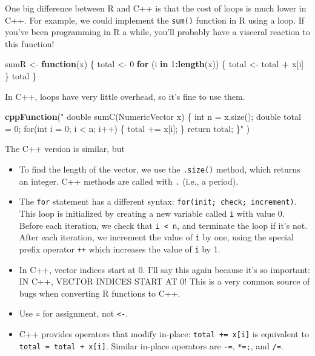 \documentclass[
]{krantz}
\makeatletter
\newenvironment{Shaded}{\begin{snugshade}}{\end{snugshade}}
\newcommand{\ControlFlowTok}[1]{\textcolor[rgb]{0.27,0.27,0.27}{\textbf{#1}}}
\newcommand{\DecValTok}[1]{\textcolor[rgb]{0.06,0.06,0.06}{#1}}
\newcommand{\KeywordTok}[1]{\textcolor[rgb]{0.27,0.27,0.27}{\textbf{#1}}}
\newcommand{\NormalTok}[1]{#1}
\newcommand{\OperatorTok}[1]{\textcolor[rgb]{0.43,0.43,0.43}{\textbf{#1}}}
\newcommand{\StringTok}[1]{\textcolor[rgb]{0.5,0.5,0.5}{#1}}
\newenvironment{kframe}{%
\medskip{}
\setlength{\fboxsep}{.8em}
 \def\at@end@of@kframe{}%
 \ifinner\ifhmode%
  \def\at@end@of@kframe{\end{minipage}}%
  \begin{minipage}{\columnwidth}%
 \fi\fi%
 \def\FrameCommand##1{\hskip\@totalleftmargin \hskip-\fboxsep
 \colorbox{shadecolor}{##1}\hskip-\fboxsep
     \hskip-\linewidth \hskip-\@totalleftmargin \hskip\columnwidth}%
 \MakeFramed {\advance\hsize-\width
   \@totalleftmargin\z@ \linewidth\hsize
   \@setminipage}}%
 {\par\unskip\endMakeFramed%
 \at@end@of@kframe}
\renewenvironment{Shaded}{\begin{kframe}}{\end{kframe}}
\makeatother
\begin{document}
One big difference between R and C++ is that the cost of loops is much lower in C++. For example, we could implement the \texttt{sum()} function in R using a loop. If you've been programming in R a while, you'll probably have a visceral reaction to this function!

\begin{Shaded}
\begin{Highlighting}[]
\NormalTok{sumR \textless{}{-}}\StringTok{ }\ControlFlowTok{function}\NormalTok{(x) \{}
\NormalTok{    total \textless{}{-}}\StringTok{ }\DecValTok{0}
    \ControlFlowTok{for}\NormalTok{ (i }\ControlFlowTok{in} \DecValTok{1}\OperatorTok{:}\KeywordTok{length}\NormalTok{(x)) \{}
\NormalTok{        total \textless{}{-}}\StringTok{ }\NormalTok{total }\OperatorTok{+}\StringTok{ }\NormalTok{x[i]}
\NormalTok{    \}}
\NormalTok{    total}
\NormalTok{\}}
\end{Highlighting}
\end{Shaded}

In C++, loops have very little overhead, so it's fine to use them.

\begin{Shaded}
\begin{Highlighting}[]
\KeywordTok{cppFunction}\NormalTok{(}\StringTok{"}
\StringTok{  double sumC(NumericVector x) \{}
\StringTok{    int n = x.size();}
\StringTok{    double total = 0;}
\StringTok{    for(int i = 0; i \textless{} n; i++) \{}
\StringTok{      total += x[i];}
\StringTok{    \}}
\StringTok{    return total;}
\StringTok{  \}"}
\NormalTok{)}
\end{Highlighting}
\end{Shaded}

The C++ version is similar, but

\begin{itemize}
\item
  To find the length of the vector, we use the \texttt{.size()} method, which returns an integer. C++ methods are called with \texttt{.} (i.e., a period).
\item
  The \texttt{for} statement has a different syntax: \texttt{for(init;\ check;\ increment)}. This loop is initialized by creating a new variable called \texttt{i} with value 0. Before each iteration, we check that \texttt{i\ \textless{}\ n}, and terminate the loop if it's not. After each iteration, we increment the value of \texttt{i} by one, using the special prefix operator \texttt{++} which increases the value of \texttt{i} by 1.
\item
  In C++, vector indices start at 0. I'll say this again because it's so important: IN C++, VECTOR INDICES START AT 0! This is a very common source of bugs when converting R functions to C++.
\item
  Use \texttt{=} for assignment, not \texttt{\textless{}-}.
\item
  C++ provides operators that modify in-place: \texttt{total\ +=\ x{[}i{]}} is equivalent to \texttt{total\ =\ total\ +\ x{[}i{]}}. Similar in-place operators are \texttt{-=}, \texttt{*=;}, and \texttt{/=}.
\end{itemize}
\end{document}
